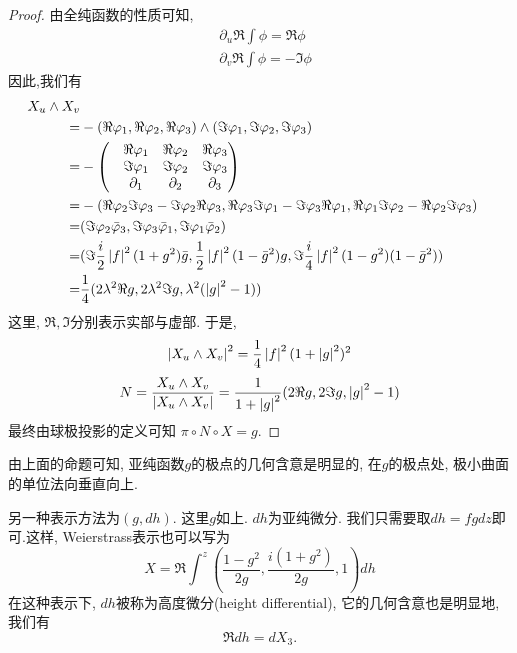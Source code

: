 \begin{proof}
    由全纯函数的性质可知, 
    \begin{align}
        &\partial_u \Re \int \phi= \Re \phi \\
        &\partial_v \Re \int \phi= -\Im \phi
    \end{align}
    因此,我们有
    \begin{equation}
        \begin{split}
            X_u \wedge X_v  \\
            =& -(\Re \varphi_1,\Re \varphi_2, \Re \varphi_3) \wedge (\Im \varphi_1, \Im \varphi_2, \Im \varphi_3) \\
            =& - \begin{pmatrix}
                & \Re \varphi_1 & \Re \varphi_2 &\Re \varphi_3 \\
                & \Im \varphi_1 & \Im \varphi_2 &\Im \varphi_3 \\
                & \partial_1 & \partial_2 &\partial_3
            \end{pmatrix} \\
            =& - (\Re\varphi_2 \Im \varphi_3- \Im \varphi_2 \Re \varphi_3, \Re \varphi_3 \Im \varphi_1- \Im\varphi_3 \Re \varphi_1, \Re \varphi_1 \Im \varphi_2 - \Re\varphi_2 \Im \varphi_3) \\
            =& (\Im \varphi_2 \bar{\varphi}_3, \Im \varphi_3 \bar{\varphi}_1, \Im \varphi_1 \bar{\varphi}_2) \\
            =&(\Im \frac{i}{2}\left | f \right |^2(1+g^2)\bar{g}, \frac{1}{2}\left | f \right |^2(1-\bar{g}^2)g, \Im \frac{i}{4}\left | f \right |^2(1-g^2)(1-\bar{g}^2)) \\
            =& \frac{1}{4}(2\lambda^2\Re g, 2\lambda^2 \Im g, \lambda^2(\left | g \right |^2-1))
        \end{split}
    \end{equation}
    这里, $\Re, \Im$分别表示实部与虚部. 于是, 
    \begin{equation}
        \left | X_u \wedge X_v \right |^2=\frac{1}{4}\left | f \right |^2(1+\left | g \right |^2)^2
    \end{equation}
    \begin{equation}
        N=\frac{X_u\wedge X_v}{\left | X_u\wedge X_v \right |}= \frac{1}{1+\left | g \right |^2}(2\Re g, 2 \Im g, \left | g \right |^2-1)
    \end{equation}
    最终由球极投影的定义可知 $\pi\circ N \circ X=g$.
\end{proof}
由上面的命题可知, 亚纯函数$g$的极点的几何含意是明显的, 在$g$的极点处, 极小曲面的单位法向垂直向上.
\par 另一种表示方法为$(g,dh)$. 这里$g$如上. $dh$为亚纯微分. 我们只需要取$dh=fgdz$即可.这样, Weierstrass表示也可以写为
\begin{equation}
    X=\Re \int^z (\frac{1-g^2}{2g}, \frac{i(1+g^2)}{2g},1)dh
\end{equation}
在这种表示下, $dh$被称为高度微分(height differential), 它的几何含意也是明显地, 我们有
\begin{equation}
    \Re dh= dX_3.
\end{equation}
